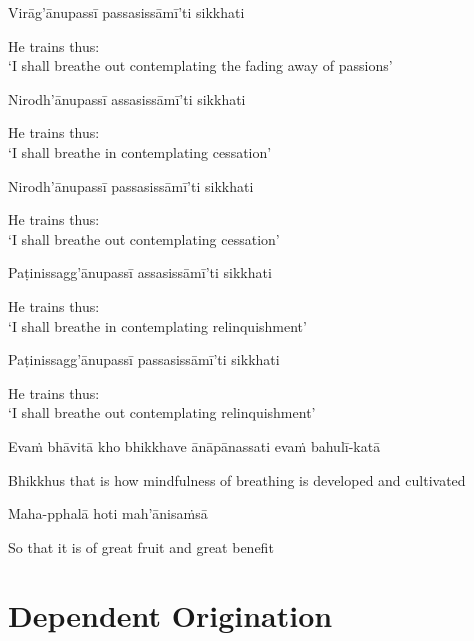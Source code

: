 Virāg'ānupassī passasissāmī'ti sikkhati

\begin{english}
  He trains thus:\\
  `I shall breathe out contemplating the fading away of passions'
\end{english}

Nirodh'ānupassī assasissāmī'ti sikkhati

\begin{english}
  He trains thus:\\
  `I shall breathe in contemplating cessation'
\end{english}

Nirodh'ānupassī passasissāmī'ti sikkhati

\begin{english}
  He trains thus:\\
  `I shall breathe out contemplating cessation'
\end{english}

Paṭinissagg'ānupassī assasissāmī'ti sikkhati

\begin{english}
  He trains thus:\\
  `I shall breathe in contemplating relinquishment'
\end{english}

Paṭinissagg'ānupassī passasissāmī'ti sikkhati

\begin{english}
  He trains thus:\\
  `I shall breathe out contemplating relinquishment'
\end{english}

Evaṁ bhāvitā kho bhikkhave ānāpānassati evaṁ bahulī-katā

\begin{english-hang}
  Bhikkhus that is how mindfulness of breathing is developed and cultivated
\end{english-hang}

Maha-pphalā hoti mah'ānisaṁsā

\begin{english}
  So that it is of great fruit and great benefit
\end{english}

\suttaRef{[MN 118]}

\ifdigitalversion{}\fi



\section{Dependent Origination}
\label{dependent-origination}

